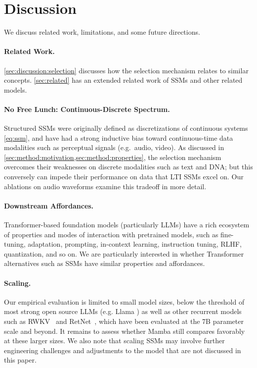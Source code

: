 \section{Discussion}
\label{sec:discussion}

We discuss related work, limitations, and some future directions.

\paragraph{Related Work.}
\cref{sec:discussion:selection} discusses how the selection mechanism relates to similar concepts.
\cref{sec:related} has an extended related work of SSMs and other related models.

\paragraph{No Free Lunch: Continuous-Discrete Spectrum.}
Structured SSMs were originally defined as discretizations of continuous systems \eqref{eq:ssm},
and have had a strong inductive bias toward continuous-time data modalities such as perceptual signals (e.g.\ audio, video).
As discussed in \cref{sec:method:motivation,sec:method:properties}, the selection mechanism overcomes their weaknesses
on discrete modalities such as text and DNA;
but this conversely can impede their performance on data that LTI SSMs excel on.
Our ablations on audio waveforms examine this tradeoff in more detail.

\paragraph{Downstream Affordances.}
Transformer-based foundation models (particularly LLMs) have a rich ecosystem of properties and modes of interaction with pretrained models,
such as fine-tuning, adaptation, prompting, in-context learning, instruction tuning, RLHF, quantization, and so on.
We are particularly interested in whether Transformer alternatives such as SSMs have similar properties and affordances.

%

\paragraph{Scaling.}
Our empirical evaluation is limited to small model sizes,
below the threshold of most strong open source LLMs (e.g. Llama \citep{touvron2023llama})
as well as other recurrent models such as RWKV~\citep{peng2023rwkv} and RetNet~\citep{sun2023retentive},
which have been evaluated at the 7B parameter scale and beyond.
It remains to assess whether Mamba still compares favorably at these larger sizes.
We also note that scaling SSMs may involve further engineering challenges and adjustments to the model
that are not discussed in this paper.

%
